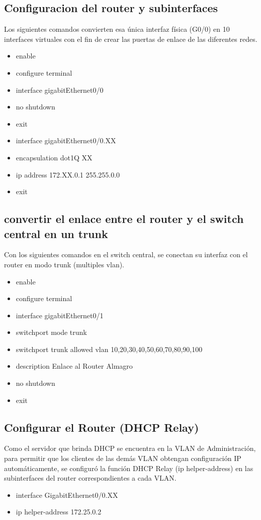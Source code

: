 \documentclass[a4paper,16pt]{article}
\begin{document}
	\subsection*{Configuracion del router y subinterfaces}
	Los siguientes comandos convierten esa única interfaz física (G0/0) en 10 interfaces virtuales con el fin de crear las puertas de enlace de las diferentes redes.
	\begin{itemize}
		\item enable
		\item configure terminal
		\item interface gigabitEthernet0/0
		\item no shutdown 
		\item exit
		\item interface gigabitEthernet0/0.XX
		\item encapsulation dot1Q XX
		\item ip address 172.XX.0.1 255.255.0.0
		\item exit
	\end{itemize}
	
	\vspace{1cm}
	
	\subsection*{convertir el enlace entre el router y el switch central en un trunk}
	Con los siguientes comandos en el switch central, se conectan su interfaz con el router en modo trunk (multiples vlan). 
	\begin{itemize}
		\item enable
		\item configure terminal
		\item interface gigabitEthernet0/1
		\item switchport mode trunk
		\item switchport trunk allowed vlan 10,20,30,40,50,60,70,80,90,100
		\item description Enlace al Router Almagro
		\item no shutdown 
		\item exit
	\end{itemize}
	
	
	\vspace{1cm}
	
	\subsection*{Configurar el Router (DHCP Relay)}
	 Como el servidor que brinda DHCP se encuentra en la VLAN de Administración, para permitir que los clientes de las demás VLAN obtengan configuración IP automáticamente, se configuró la función DHCP Relay (ip helper-address) en las subinterfaces del router correspondientes a cada VLAN.
	\begin{itemize}
		\item interface GigabitEthernet0/0.XX
		\item ip helper-address 172.25.0.2
	\end{itemize}
\end{document}
